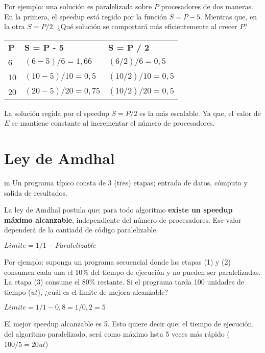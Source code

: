 \documentclass[a4paper, 10pt]{report}
\begin{document}
Por ejemplo: una solución es paralelizada sobre $P$ procesadores de dos maneras. En la primera, el speedup está regido por la función $S = P-5$. Mientras que, en la otra $S = P/2$. ¿Qué solución se comportará más eficientemente al crecer $P$?

{\renewcommand{\arraystretch}{2}%
\begin{center}
\begin{tabular}{p{2cm} p{4cm} p{4cm}}
\textbf{P} &  \textbf{S = P - 5} & \textbf{S = P / 2} \\
6 & $(6-5)/6=1,66$ & $(6/2)/6=0,5$ \\
\hline
10 & $(10-5)/10=0,5$ & $(10/2)/10=0,5$ \\
\hline
20 & $(20-5)/20=0,75$ & $(10/2)/20=0,5$ \\
\end{tabular}
\end{center}}

La solución regida por el speedup $S = P/2$ es la más escalable. Ya que, el valor de $E$ se mantiene constante al incrementar el número de procesadores.

\section{Ley de Amdhal}
   m            
Un programa típico consta de 3 (tres) etapas; entrada de datos, cómputo y salida de resultados. 

La ley de Amdhal postula que; para todo algoritmo \textbf{existe un speedup máximo alcanzable}, independiente del número de procesadores. Ese valor dependerá de la cantiadd de código paralelizable.

\begin{center}
    $Limite = 1 / 1 - Paralelizable$
\end{center}

Por ejemplo: suponga un programa secuencial donde las etapas (1) y (2) consumen cada una el 10\% del tiempo de ejecución y no pueden ser paralelizadas. La etapa (3) consume el 80\% restante. Si el programa tarda 100 unidades de tiempo ($ut$), ¿cuál es el limite de mejora alcanzable?

\begin{center}
    $Limite = 1 / 1 - 0,8 = 1 / 0,2 = 5$
\end{center}

El mejor speedup alcanzable es 5. Esto quiere decir que; el tiempo de ejecución, del algoritmo paralelizado, será como máximo hsta 5 veces más rápido ($100/5 = 20 ut$)
\end{document}
